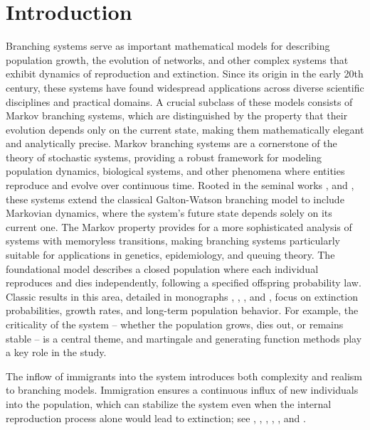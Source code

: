 \documentclass[10pt,reqno]{amsart}
\theoremstyle{definition}
\numberwithin{equation}{section}
\begin{document}
\maketitle




\section{Introduction}            \label{IIBSec1}

    Branching systems serve as important mathematical models for describing population growth, the evolution of networks,
    and other complex systems that exhibit dynamics of reproduction and extinction. Since its origin in the
    early 20th century, these systems have found widespread applications across diverse scientific disciplines and
    practical domains. A crucial subclass of these models consists of Markov branching systems, which are distinguished
    by the property that their evolution depends only on the current state, making them mathematically elegant and
    analytically precise. Markov branching systems are a cornerstone of the theory of stochastic systems, providing
    a robust framework for modeling population dynamics, biological systems, and other phenomena where entities reproduce
    and evolve over continuous time. Rooted in the seminal works {\cite{Pakes75}}, {\cite{Sev57}} and {\cite{Sev51}}, these
    systems extend the classical Galton-Watson branching model to include Markovian dynamics, where the system's future state
    depends solely on its current one. The Markov property provides for a more sophisticated analysis of systems with memoryless
    transitions, making branching systems particularly suitable for applications in genetics, epidemiology, and queuing
    theory. The foundational model describes a closed population where each individual reproduces and dies independently,
    following a specified offspring probability law. Classic results in this area, detailed in monographs {\cite{AsHer}}, {\cite{ANey}},
    {\cite{Bingham}}, {\cite{Harris63}} and {\cite{Jagers75}}, focus on extinction probabilities, growth rates, and long-term
    population behavior. For example, the criticality of the system -- whether the population grows, dies out, or remains
    stable -- is a central theme, and martingale and generating function methods play a key role in the study.

    The inflow of immigrants into the system introduces both complexity and realism to branching models. Immigration
    ensures a continuous influx of new individuals into the population, which can stabilize the system even when
    the internal reproduction process alone would lead to extinction; see {\cite{ChenSPA93}}, {\cite{LiDEDS21}},
    {\cite{LiChPaCh20}}, {\cite{LiChPakes12}}, {\cite{Pakes79}}, {\cite{Pakes76}} and {\cite{Pakes75}}.
\end{document}
